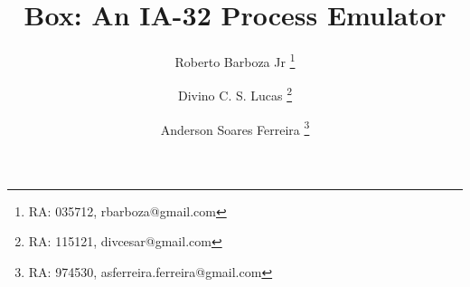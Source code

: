 \documentclass[11pt,twoside]{article}
\begin{document}
% 

%



\TRMakeCover


%
\pagestyle{myheadings}

%
\title{Box: An IA-32 Process Emulator}

\author{
 Roberto Barboza Jr
   \thanks{RA: 035712, rbarboza@gmail.com} \and
 Divino C. S. Lucas
   \thanks{RA: 115121, divcesar@gmail.com} \and
 Anderson Soares Ferreira
   \thanks{RA: 974530, asferreira.ferreira@gmail.com}
}

\date{}

\maketitle

\end{document}
